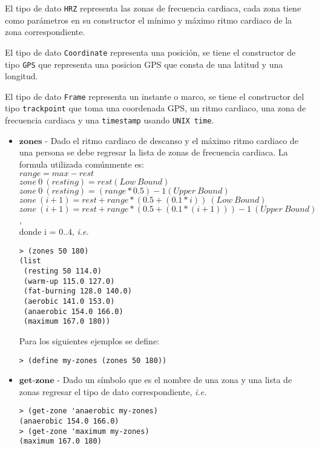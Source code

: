 \documentclass{article}
\begin{document}
El tipo de dato \verb;HRZ; representa las zonas de frecuencia cardiaca,
cada zona tiene como parámetros en su constructor el mínimo y máximo ritmo cardiaco
de la zona correspondiente.

El tipo de dato \verb;Coordinate; representa una posición, se tiene el constructor
de tipo \verb;GPS; que representa una posicion GPS que consta de una latitud y una longitud.

El tipo de dato \verb;Frame; representa un instante o marco, se tiene el constructor del tipo \verb;trackpoint; que toma una coordenada GPS, un ritmo cardiaco, una zona de frecuencia cardiaca y una \verb;timestamp; usando \verb;UNIX time;.

\begin{itemize}
\item $\textbf{zones}$ - Dado el ritmo cardiaco de descanso y el máximo ritmo cardiaco de una persona se debe regresar la lista de zonas de frecuencia cardiaca. La formula utilizada comúnmente es:\\
  $range = max - rest$\\
  $zone\ 0\ (resting) = rest (Low\ Bound)$\\
  $zone\ 0\ (resting) = (range * 0.5) - 1 (Upper\ Bound)$\\
  $zone\ (i+1) = rest + range * (0.5 + (0.1 * i))\ (Low\ Bound)$\\
  $zone\ (i+1) = rest + range * (0.5 + (0.1 * (i+1))) - 1\ (Upper\ Bound)$,\\
  donde i = $0..4$, \textit{i.e.}

\begin{verbatim}
> (zones 50 180)
(list
 (resting 50 114.0)
 (warm-up 115.0 127.0)
 (fat-burning 128.0 140.0)
 (aerobic 141.0 153.0)
 (anaerobic 154.0 166.0)
 (maximum 167.0 180))
\end{verbatim}

Para los siguientes ejemplos se define:
\begin{verbatim}
> (define my-zones (zones 50 180))
\end{verbatim}

\item $\textbf{get-zone}$ - Dado un símbolo que es el nombre de una zona y una lista de zonas regresar el tipo de dato correspondiente, \textit{i.e.}
\begin{verbatim}
> (get-zone 'anaerobic my-zones)
(anaerobic 154.0 166.0)
> (get-zone 'maximum my-zones)
(maximum 167.0 180)
\end{verbatim}


\end{itemize}
\end{document}
